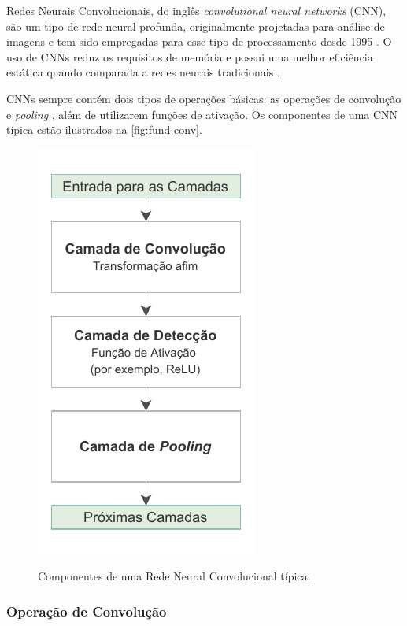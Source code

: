 Redes Neurais Convolucionais, do inglês \textit{convolutional neural networks} (CNN), são um tipo de rede neural profunda, originalmente projetadas para análise de imagens \cite{ref:Eden-Ierapetritou-Towler} e tem sido empregadas para esse tipo de processamento desde 1995 \cite{ref:Yan}. O uso de CNNs reduz os requisitos de memória e possui uma melhor eficiência estática quando comparada a redes neurais tradicionais \cite{ref:Goodfellow-Bengio-Courville}.

CNNs sempre contém dois tipos de operações básicas: as operações de convolução e \textit{pooling} \cite{ref:Eden-Ierapetritou-Towler}, além de utilizarem funções de ativação. Os componentes de uma CNN típica estão ilustrados na \autoref{fig:fund-conv}.

\begin{figure}[h!] %
  \centering
  \caption{Componentes de uma Rede Neural Convolucional típica.}
  \includegraphics[scale=1.1]{img/img-fundamentacao-conv.pdf}
  \label{fig:fund-conv}
\end{figure}

\subsubsection{Operação de Convolução} \label{cap:fund-ia-rn-conv-conv}


